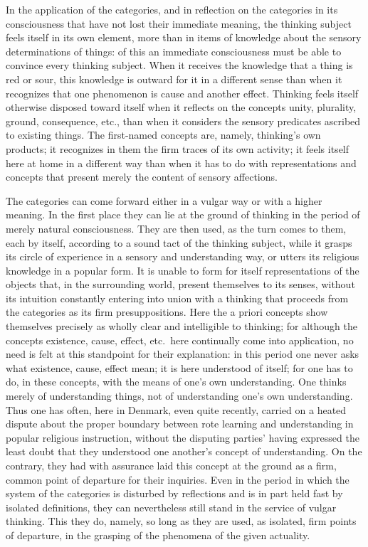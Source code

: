 \documentclass[12pt]{article}
\newcommand{\opage}[1]{\marginnote{\footnotesize\textit{[#1]}}}
\begin{document}
In the application of the categories, and in reflection on the categories in its
consciousness that have not lost their immediate meaning, the thinking subject
feels itself in its own element, more than in items of knowledge about the sensory
determinations of things: of this an immediate consciousness must be able to
convince every thinking subject. When it receives the knowledge that a thing is
red or sour, this knowledge is outward for it in a different sense than when it
recognizes that one phenomenon is cause and another effect. Thinking feels itself
otherwise disposed toward itself when it reflects on the concepts unity,
plurality, ground, consequence, etc., than when it considers the sensory
predicates ascribed to existing things. The first-named concepts are, namely,
thinking's own products; it recognizes in them the firm traces of its own
activity; it feels itself here at home in a different way than when it has to do
with representations and concepts that present merely the content of sensory
affections.

The categories can come forward either in a vulgar way or with a higher meaning.
In the first place they can lie at the ground of thinking in the period of merely
natural consciousness. They are then used, as the turn comes to them, each by
itself, according to a sound tact of the thinking subject, while it grasps its
circle of experience in a sensory and understanding way, or utters its religious
knowledge in a popular form. It is unable to form for itself representations of
the objects that, in the surrounding world, present themselves to its senses,
without its intuition constantly entering into union with a thinking that proceeds
from the categories as its firm presuppositions. Here \opage{199}the a priori
concepts show themselves precisely as wholly clear and intelligible to thinking;
for although the concepts existence, cause, effect, etc.\ here continually come
into application, no need is felt at this standpoint for their explanation: in this
period one never asks what existence, cause, effect mean; it is here understood of
itself; for one has to do, in these concepts, with the means of one's own
understanding. One thinks merely of understanding things, not of understanding
one's own understanding. Thus one has often, here in Denmark, even quite recently,
carried on a heated dispute about the proper boundary between rote learning and
understanding in popular religious instruction, without the disputing parties'
having expressed the least doubt that they understood one another's concept of
understanding. On the contrary, they had with assurance laid this concept at the
ground as a firm, common point of departure for their inquiries. Even in the
period in which the system of the categories is disturbed by reflections and is
in part held fast by isolated definitions, they can nevertheless still stand in the
service of vulgar thinking. This they do, namely, so long as they are used, as
isolated, firm points of departure, in the grasping of the phenomena of the given
actuality.
\end{document}
